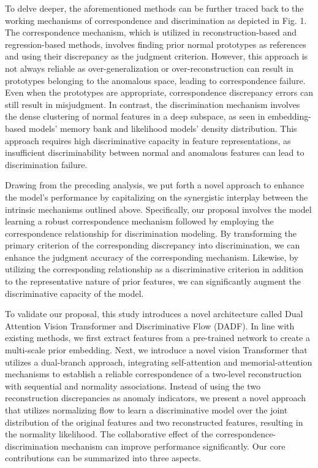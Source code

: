\documentclass[journal]{IEEEtran}
\begin{document}
To delve deeper, the aforementioned methods can be further traced back to the working mechanisms of correspondence and discrimination as depicted in Fig. 1. The correspondence mechanism, which is utilized in reconstruction-based and regression-based methods, involves finding prior normal prototypes as references and using their discrepancy as the judgment criterion. However, this approach is not always reliable as over-generalization or over-reconstruction can result in prototypes belonging to the anomalous space, leading to correspondence failure. Even when the prototypes are appropriate, correspondence discrepancy errors can still result in misjudgment.  In contrast, the discrimination mechanism involves the dense clustering of normal features in a deep subspace, as seen in embedding-based models' memory bank and likelihood models' density distribution. This approach requires high discriminative capacity in feature representations, as insufficient discriminability between normal and anomalous features can lead to discrimination failure.

Drawing from the preceding analysis, we put forth a novel approach to enhance the model's performance by capitalizing on the synergistic interplay between the intrinsic mechanisms outlined above. Specifically, our proposal involves the model learning a robust correspondence mechanism followed by employing the correspondence relationship for discrimination modeling. By transforming the primary criterion of the corresponding discrepancy into discrimination, we can enhance the judgment accuracy of the corresponding mechanism. Likewise, by utilizing the corresponding relationship as a discriminative criterion in addition to the representative nature of prior features, we can significantly augment the discriminative capacity of the model.


To validate our proposal, this study introduces a novel architecture called Dual Attention Vision Transformer and Discriminative Flow (DADF). In line with existing methods, we first extract features from a pre-trained network to create a multi-scale prior embedding. Next, we introduce a novel vision Transformer that utilizes a dual-branch approach, integrating self-attention and memorial-attention mechanisms to establish a reliable correspondence of a two-level reconstruction with sequential and normality associations. Instead of using the two reconstruction discrepancies as anomaly indicators, we present a novel approach that utilizes normalizing flow to learn a discriminative model over the joint distribution of the original features and two reconstructed features, resulting in the normality likelihood. The collaborative effect of the correspondence-discrimination mechanism can improve performance significantly. Our core contributions can be summarized into three aspects.
\end{document}
